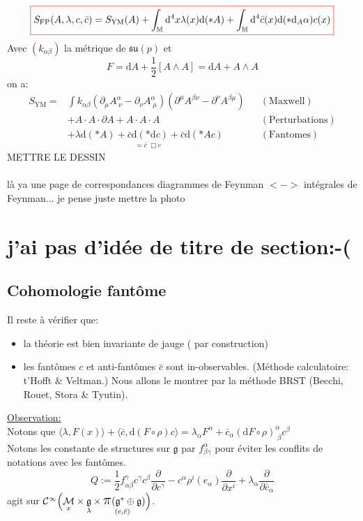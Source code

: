 \documentclass[a4paper,11pt]{article}
\renewcommand{\d}{{\mathrm{d}}}
\newcommand{\dr}[2]{\frac{\partial {#1}}{\partial{#2}}}
\newcommand{\ppi}{{\mathlarger{\mathlarger{\mathlarger{\pi}}}}}
\begin{document}
$$\color{red}\boxed{\color{black}
S_\mathrm{FP}(A,\lambda,c,\bar c) = S_\mathrm{YM}(A)+ \int_\mathbb{M}\d^4x \lambda(x) \d(*A) + \int_\mathbb{M}\d^4 \bar c(x) \d(*\d_A\alpha) c(x)
\color{red}}\color{black}$$
Avec $(k_{\alpha\beta})$ la métrique de $\mathfrak{su}(p)$ et
$$F=\d A + \frac12[A\wedge A]= \d A + A\wedge A$$
on a:
\begin{align*}
S_\mathrm{YM} =& \int k_{\alpha\beta} (\partial_\mu A^\alpha_{\;\nu} - \partial_\nu A^\alpha_{\;\mu})(\partial^\mu A^{\beta\nu} - \partial^\nu A^{\beta\mu}) && (\mathrm{Maxwell})\\
&+A\cdot A\cdot\partial A + A\cdot A\cdot A&&(\mathrm{Perturbations})\\
&+\lambda\d(*A) + \underset{= \bar c \;\Box c}{\bar c\d(*\d c)} + \bar c\d(*A c) &&(\mathrm{Fantomes})
\end{align*}
\color{red}METTRE LE DESSIN\\ \\
là ya une page de correspondances diagrammes de Feynman $<->$ intégrales de Feynman... je pense juste mettre la photo\color{black}
\section{\color{red}j'ai pas d'idée de titre de section:-(\color{black}}
\subsection{Cohomologie fantôme}
\noindent Il reste à vérifier que:
\begin{itemize}
\item la théorie est bien invariante de jauge (\color{Green}\checkmark\color{black} par construction)
\item les fantômes $c$ et anti-fantômes $\bar c$ sont in-observables. (Méthode calculatoire: t'Hofft \& Veltman.) Nous allons le montrer par la méthode BRST (Becchi, Rouet, Stora \& Tyutin).
\end{itemize}
\underline{Observation:}\\
Notons que $\langle\lambda,F(x)\rangle + \langle\bar c, \d(F\circ\rho)c\rangle = \lambda_\alpha F^\alpha+\bar c_\alpha(\d F\circ\rho)^\alpha_{\;\beta} c^\beta$\\
Notons les constante de structures sur $\mathfrak{g}$ par $f^\alpha_{\beta\gamma}$ pour éviter les conflits de notations avec les fantômes.
$$\boxed{
Q:=\frac12 f^\gamma_{\alpha\beta} c^\gamma c^\beta\dr{}{c^\gamma} - c^\alpha\rho^i(e_\alpha)\dr{}{x^i}+\lambda_\alpha\dr{}{\bar c_\alpha}
}$$
agit sur $\mathcal{C}^\infty\Big(\underset x {\mathcal M}\times \underset \lambda {\mathfrak g} \times \underset{(c,\bar c)} {\ppi(\mathfrak g^*\oplus\mathfrak g})\Big) $.\\
\end{document}
